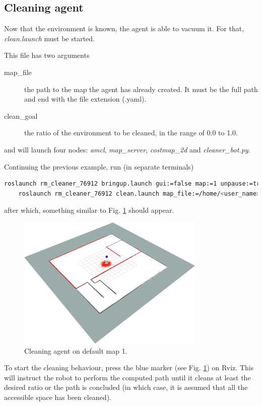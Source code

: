 \documentclass[]{article}
\begin{document}
\subsection{Cleaning agent}

Now that the environment is known, the agent is able to vacuum it. For that, \textit{clean.launch} must be started. 

This file has two arguments
%
\begin{description}
    \item[map\_file] the path to the map the agent has already created. It must be the full path and end with the file extension (.yaml).
    \item[clean\_goal] the ratio of the environment to be cleaned, in the range of 0.0 to 1.0.
\end{description}
%
and will launch four nodes: \textit{amcl}, \textit{map\_server}, \textit{costmap\_2d} and \textit{cleaner\_bot.py}.

Continuing the previous example, run (in separate terminals)
%
\begin{lstlisting}[language=bash]
    roslaunch rm_cleaner_76912 bringup.launch gui:=false map:=1 unpause:=true rviz:=true
    roslaunch rm_cleaner_76912 clean.launch map_file:=/home/<user_name>/rm_cleaner_ws/src/rm_cleaner_76912/maps/<map_name>.yaml clean_goal:=<goal>
\end{lstlisting}
%
after which, something similar to Fig. \ref{fig:clean_agent} should appear.

\begin{figure}[ht]
    \centering
    \includegraphics[width=0.8\textwidth]{imgs/clean_agent.png}
    \caption{Cleaning agent on default map 1.}
    \label{fig:clean_agent}
\end{figure}

To start the cleaning behaviour, press the blue marker (see Fig. \ref{fig:clean_agent}) on Rviz. This will instruct the robot to perform the computed path until it cleans at least the desired ratio or the path is concluded (in which case, it is assumed that all the accessible space has been cleaned).
\end{document}

